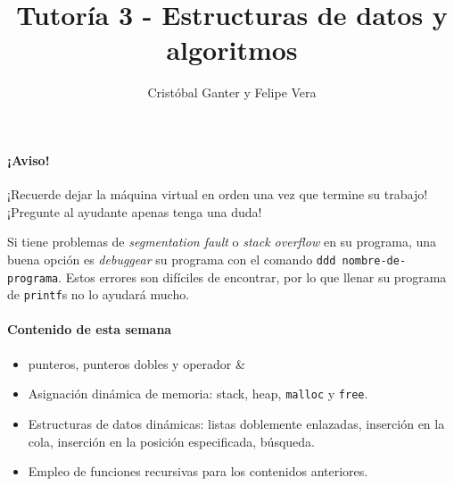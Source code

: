 \documentclass[a4paper,10pt]{article}
\title{Tutoría 3 - Estructuras de datos y algoritmos}
\author{Cristóbal Ganter y Felipe Vera}
\begin{document}
\maketitle

\paragraph{¡Aviso!} ¡Recuerde dejar la máquina virtual en orden una vez que termine su trabajo!
¡Pregunte al ayudante apenas tenga una duda!

Si tiene problemas de \textit{segmentation fault} o \textit{stack overflow} en su programa, una buena opción es \textit{debuggear} su programa con el comando \texttt{ddd nombre-de-programa}.
Estos errores son difíciles de encontrar, por lo que llenar su programa de \texttt{printf}s no lo ayudará mucho.

\paragraph{Contenido de esta semana}
\begin{itemize}
  \item punteros, punteros dobles y operador \&
  \item Asignación dinámica de memoria: stack, heap, \texttt{malloc} y \texttt{free}.
  \item Estructuras de datos dinámicas: listas doblemente enlazadas, inserción en la cola, inserción en la posición especificada, búsqueda.
  \item Empleo de funciones recursivas para los contenidos anteriores.
\end{itemize}
\end{document}
